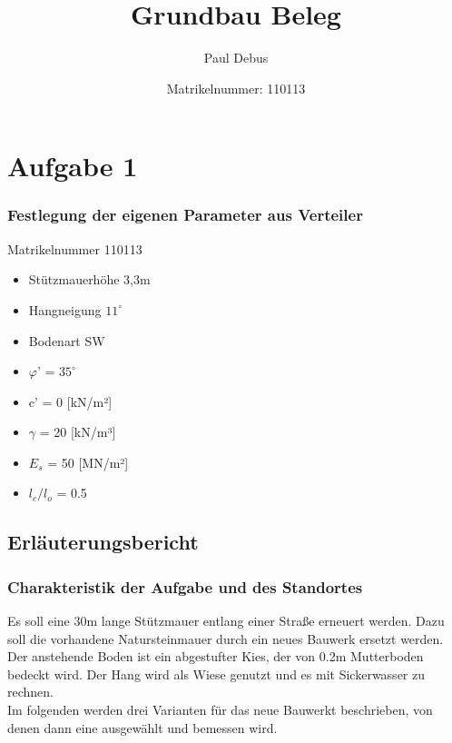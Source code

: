 \documentclass[11pt,fleqn,a4paper,halfparskip]{article}
\title{Grundbau Beleg}
\author{Paul Debus \and Matrikelnummer: 110113}
\begin{document}
\maketitle


\tableofcontents
\newpage
{}
\section{Aufgabe 1}
\subsubsection*{Festlegung der eigenen Parameter aus Verteiler}
Matrikelnummer 110113
\begin{itemize}
\item Stützmauerhöhe 3,3m
\item Hangneigung $11^\circ$
\item Bodenart SW
\item $\varphi $' = $35^\circ$
\item c' = 0 [kN/m²]
\item $\gamma$ = 20 [kN/m³]
\item $E_s$ = 50 [MN/m²]
\item $l_c/l_o$ = 0.5
\end{itemize}
\subsection{Erläuterungsbericht}
\subsubsection*{Charakteristik der Aufgabe und des Standortes}
Es soll eine 30m lange Stützmauer entlang einer Straße erneuert werden. Dazu soll die vorhandene Natursteinmauer durch ein neues Bauwerk ersetzt werden. Der anstehende Boden ist ein abgestufter Kies, der von 0.2m Mutterboden bedeckt wird. Der Hang wird als Wiese genutzt und es mit Sickerwasser zu rechnen. \\
Im folgenden werden drei Varianten für das neue Bauwerkt beschrieben, von denen dann eine ausgewählt und bemessen wird.
\end{document}
